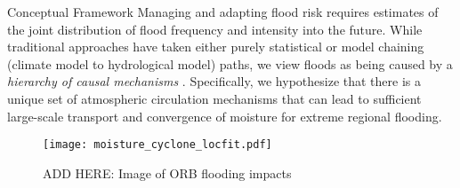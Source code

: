 \begin{block}{Conceptual Framework}
    Managing and adapting flood risk requires estimates of the joint distribution of flood frequency and intensity into the future.
    While traditional approaches have taken either purely statistical or model chaining (climate model to hydrological model) paths, we view floods as being caused by a \emph{hierarchy of causal mechanisms} \cite[see][]{Merz2014}.
    Specifically, we hypothesize that there is a unique set of atmospheric circulation mechanisms that can lead to sufficient large-scale transport and convergence of moisture for extreme regional flooding.
    \begin{figure}
        \centering
        \texttt{[image: moisture\_cyclone\_locfit.pdf]}
        \caption{ADD HERE: Image of ORB flooding impacts}
        \label{fig:orb-floods}
    \end{figure}
\end{block}
